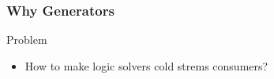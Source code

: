 \documentclass[presentation]{beamer}
\begin{document}
\begin{frame}%
    \frametitle{Why Generators}

    \begin{alertblock}{Problem}
        \begin{itemize}
            \item How to make logic solvers \alert{cold} strems consumers? 
        \end{itemize}
    \end{alertblock}

\end{frame}
\end{document}
